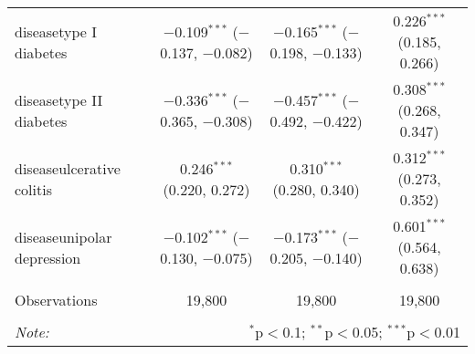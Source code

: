 \begin{table}[!htbp]
\begin{tabular}{@{\extracolsep{5pt}}lccc}
  diseasetype I diabetes & $-$0.109$^{***}$ ($-$0.137, $-$0.082) & $-$0.165$^{***}$ ($-$0.198, $-$0.133) & 0.226$^{***}$ (0.185, 0.266) \\ 
  diseasetype II diabetes & $-$0.336$^{***}$ ($-$0.365, $-$0.308) & $-$0.457$^{***}$ ($-$0.492, $-$0.422) & 0.308$^{***}$ (0.268, 0.347) \\ 
  diseaseulcerative colitis & 0.246$^{***}$ (0.220, 0.272) & 0.310$^{***}$ (0.280, 0.340) & 0.312$^{***}$ (0.273, 0.352) \\ 
  diseaseunipolar depression & $-$0.102$^{***}$ ($-$0.130, $-$0.075) & $-$0.173$^{***}$ ($-$0.205, $-$0.140) & 0.601$^{***}$ (0.564, 0.638) \\ 
 \hline \\[-1.8ex] 
Observations & 19,800 & 19,800 & 19,800 \\ 
\hline 
\hline \\[-1.8ex] 
\textit{Note:}  & \multicolumn{3}{r}{$^{*}$p$<$0.1; $^{**}$p$<$0.05; $^{***}$p$<$0.01} \\ 
\end{tabular} 
\end{table} 
